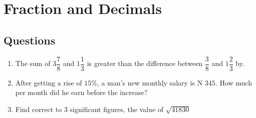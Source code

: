 \section{Fraction and Decimals}
\subsection{Questions}
\begin{multicols}{2}
\begin{enumerate}[label={\arabic*.}]
\item The sum of \(3 {\dfrac {7}{8}}\) and \(1{\dfrac{1}{3}}\) is greater than the difference between \(\dfrac {3}{8}\) and \(1{\dfrac{2}{3}}\) by.
    \begin{enumerate}[label={\Alph*.}]
    \end{enumerate}
\item  After getting a rise of \(15\%\), a man's new monthly salary is N \(345\). How much per month did he earn before the increase? 
    \begin{enumerate}[label={\Alph*.}]
    \end{enumerate}
\item Find correct to \(3\) significant figures, the value of \(\sqrt{41830}\)
    \begin{enumerate}[label={\Alph*.}]
\end{enumerate}
\end{enumerate}
\end{multicols}
